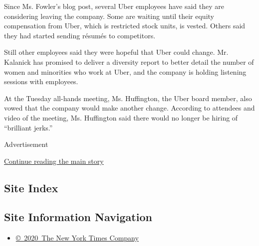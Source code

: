 Since Ms. Fowler's blog post, several Uber employees have said they are
considering leaving the company. Some are waiting until their equity
compensation from Uber, which is restricted stock units, is vested.
Others said they had started sending résumés to competitors.

Still other employees said they were hopeful that Uber could change. Mr.
Kalanick has promised to deliver a diversity report to better detail the
number of women and minorities who work at Uber, and the company is
holding listening sessions with employees.

At the Tuesday all-hands meeting, Ms. Huffington, the Uber board member,
also vowed that the company would make another change. According to
attendees and video of the meeting, Ms. Huffington said there would no
longer be hiring of ``brilliant jerks.''

Advertisement

\protect\hyperlink{after-bottom}{Continue reading the main story}

\hypertarget{site-index}{%
\subsection{Site Index}\label{site-index}}

\hypertarget{site-information-navigation}{%
\subsection{Site Information
Navigation}\label{site-information-navigation}}

\begin{itemize}
\tightlist
\item
  \href{https://help.nytimes3xbfgragh.onion/hc/en-us/articles/115014792127-Copyright-notice}{©~2020~The
  New York Times Company}
\end{itemize}

